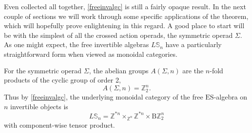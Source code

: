 \documentclass{amsbook} %
\numberwithin{section}{chapter}
\begin{document}
Even collected all together, \cref{freeinvalgc} is still a fairly opaque result. In the next couple of sections we will work through some specific applications of the theorem, which will hopefully prove enlightening in this regard. A good place to start will be with the simplest of all the crossed action operads, the symmetric operad $\Sigma$. As one might expect, the free invertible algebras $L\mathbb{S}_n$ have a particularly straightforward form when viewed as monoidal categories.

\begin{prop} \label{invsymcat} For the symmetric operad $\Sigma$, the abelian groups $A(\Sigma,n)$ are the $n$-fold products of the cyclic group of order 2,
  \[
    A(\Sigma,n) = \mathbb{Z}_2^{n}.
  \]
Thus by \cref{freeinvalgc}, the underlying monoidal category of the free $\mathrm{ES}$-algebra on $n$ invertible objects is
  \[
    L\mathbb{S}_n = \mathbb{Z}^{\ast n} \times_{\mathbb{Z}^n} \mathbb{Z}^{\ast n}  \times \mathrm{B}\mathbb{Z}_2^{n}
  \]
with component-wise tensor product.
\end{prop}
\end{document}
